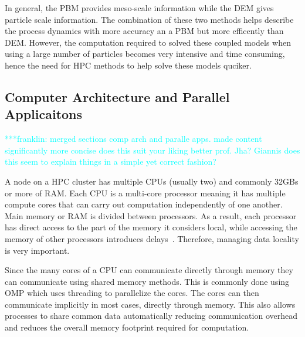 \documentclass[preprint,11pt,authoryear]{elsarticle}
\newcommand{\jhanote}[1]{ {\textcolor{red} { ***shantenu: #1 }}}
\newcommand{\csnote}[1]{ {\textcolor{blue} { ***chaitanya: #1 }}}
\newcommand{\gpnote}[1]{{\textcolor{green} {***giannis: #1}}}
\newcommand{\fbnote}[1]{{\textcolor{cyan} { ***franklin: #1 }}}
\newcommand{\jhanote}[1]{}
\newcommand{\csnote}[1]{}
\newcommand{\gpnote}[1]{}
\begin{document}
In general, the PBM provides meso-scale information while the DEM gives 
particle scale information. The combination of these two methods helps 
describe the process dynamics with more accuracy an a PBM but more efficently 
than DEM. However, the computation required to solved these coupled models 
when using a large number of particles becomes very intensive and time 
consuming, hence the need for HPC methods to help solve these models quciker.
 

\subsection{Computer Architecture and Parallel Applicaitons}

\fbnote{merged sections comp arch and paralle apps. made content significantly more concise
does this suit your liking better prof. Jha? Giannis does this seem to explain things in a simple
yet correct fashion?}

A node on a HPC cluster has multiple CPUs (usually two) and commonly 32GBs or more of RAM. 
Each CPU is a multi-core processor meaning it has multiple compute cores that can carry 
out computation independently of one another. Main memory or RAM is divided between processors.
As a result, each processor has direct access to the part of the memory it considers local,
 while accessing the memory of other processors introduces delays~\cite{Jin2011}. 
Therefore, managing data locality is very important.
 

Since the many cores of a CPU can communicate directly through memory they can 
communicate using shared memory methods. This is commonly done using OMP 
which uses threading to parallelize the cores. 
The cores can then communicate implicitly in most cases, directly through memory. 
This also allows processes to share common data automatically reducing 
communication overhead and reduces the overall memory footprint required 
for computation.
\end{document}
